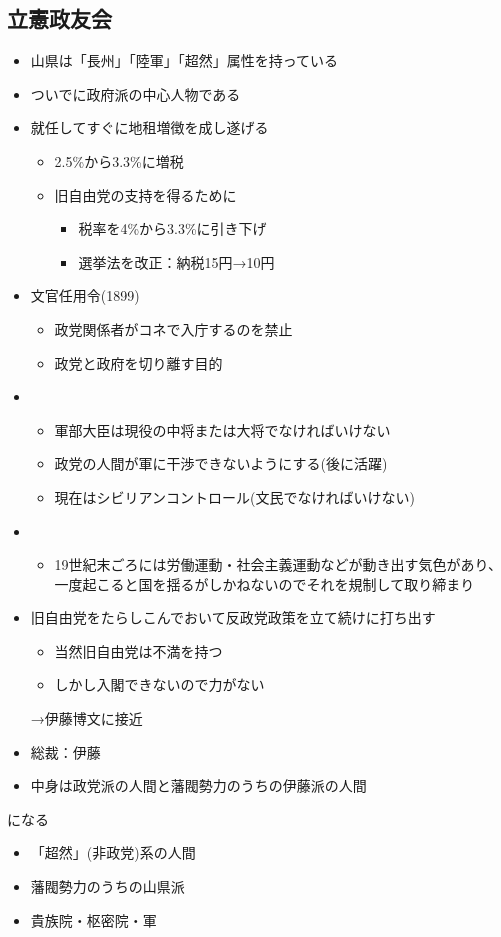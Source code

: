 \documentclass[12pt,fleqn]{ltjsarticle}
\begin{document}
\subsection{立憲政友会}
\begin{itemize}
\item 山県は「長州」「陸軍」「超然」属性を持っている
\item ついでに政府派の中心人物である
\item 就任してすぐに地租増徴を成し遂げる
\begin{itemize}
\item 2.5\%から3.3\%に増税
\item 旧自由党の支持を得るために
\begin{itemize}
\item 税率を4\%から3.3\%に引き下げ
\item 選挙法を改正：納税15円→10円
\end{itemize}
\end{itemize}
\item 文官任用令(1899)
\begin{itemize}
\item 政党関係者がコネで入庁するのを禁止
\item 政党と政府を切り離す目的
\end{itemize}
\item {}
\begin{itemize}
\item 軍部大臣は現役の中将または大将でなければいけない
\item 政党の人間が軍に干渉できないようにする(後に活躍)
\item 現在はシビリアンコントロール(文民でなければいけない)
\end{itemize}
\item {}
\begin{itemize}
\item 19世紀末ごろには労働運動・社会主義運動などが動き出す気色があり、
一度起こると国を揺るがしかねないのでそれを規制して取り締まり
\end{itemize}
\item 旧自由党をたらしこんでおいて反政党政策を立て続けに打ち出す
\begin{itemize}
\item 当然旧自由党は不満を持つ
\item しかし入閣できないので力がない
\end{itemize}
→伊藤博文に接近
\end{itemize}
\begin{itemize}
\item 総裁：伊藤
\item 中身は政党派の人間と藩閥勢力のうちの伊藤派の人間
\end{itemize}
になる
\begin{itemize}
\item 「超然」(非政党)系の人間
\item 藩閥勢力のうちの山県派
\item 貴族院・枢密院・軍
\end{itemize}
\end{document}
